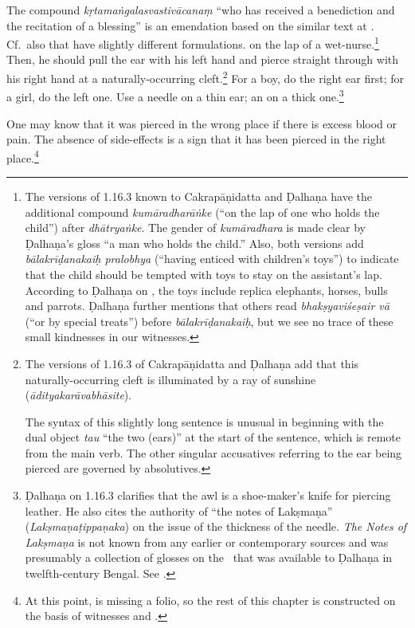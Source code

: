\begin{translation}
{The compound \emph{kṛtamaṅgalasvastivācanaṃ} “who has received a benediction and
the recitation of a blessing” is an emendation based on the similar text at
.  Cf.\ also  that have slightly
different formulations.} on the lap of a wet-nurse.\footnote{The versions of
    1.16.3 known to Cakrapāṇidatta \citep[126]{acar-1939} and Ḍalhaṇa
    \citep[76]{vulgate} have the additional compound \emph{kumāradharāṅke} (“on the
    lap of one who holds the child”) after \emph{dhātryaṅke}. The gender of
    \emph{kumāradhara} is made clear by  Ḍalhaṇa's gloss “a man who holds the child.”
    Also, both versions add \emph{bālakrīḍanakaiḥ pralobhya} (“having enticed with
    children's toys”) to indicate that the child should be tempted with toys to stay
    on the assistant's lap. According to Ḍalhaṇa on , the toys include
    replica elephants, horses, bulls and parrots. Ḍalhaṇa further mentions that others
    read \emph{bhakṣyaviśeṣair vā} (“or by special treats”) before
    \emph{bālakrīḍanakaiḥ}, but we see no trace of these small kindnesses in our
    witnesses.} Then, he should pull the ear with his left hand 
    and pierce straight through with his right hand at a naturally-occurring
    cleft.\footnote{The versions of 1.16.3 of Cakrapāṇidatta \citep[126]{acar-1939}
        and Ḍalhaṇa \citep[76]{vulgate} add that this naturally-occurring cleft is
        illuminated by a ray of sunshine  (\emph{ādityakarāvabhāsite}).

The syntax of this slightly long sentence is unusual in beginning with the dual
object \emph{tau} “the two (ears)” at the start of the sentence, which is remote
from the main verb.  The other singular accusatives referring to the ear being
pierced are governed by absolutives.} For a boy, do the right ear first; for a
girl, do the left one. Use a needle on a thin ear; an  on a thick
one.\footnote{Ḍalhaṇa on 1.16.3 \citep[76]{vulgate} clarifies that the awl is a
    shoe-maker's knife for piercing leather.  He also cites the authority of “the
    notes of Lakṣmaṇa” (\emph{Lakṣmaṇaṭippaṇaka}) on the issue of the thickness of the
    needle. \textit{The Notes of Lakṣmaṇa} is not known from any earlier or
    contemporary sources and was presumably a collection of glosses on the \SS\ that
    was available to Ḍalhaṇa in twelfth-century Bengal. See \citet[IA,
    386]{meul-hist}.}
    
\item [3]  
    
One may know that it was pierced in the wrong place if there is excess blood or
pain. The absence of side-effects is a sign that it has been pierced in the right
place.\footnote{At this point,  is missing a folio, so
    the rest of this chapter is constructed on the basis of witnesses
     and .}
    

\end{translation}
